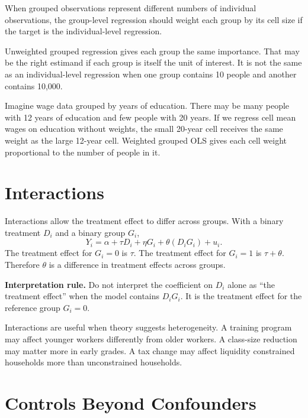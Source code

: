 \begin{thmN}
When grouped observations represent different numbers of individual
observations, the group-level regression should weight each group by its cell
size if the target is the individual-level regression.
\end{thmN}

Unweighted grouped regression gives each group the same importance. That may
be the right estimand if each group is itself the unit of interest. It is not
the same as an individual-level regression when one group contains 10 people
and another contains 10,000.

\begin{exmp}
Imagine wage data grouped by years of education. There may be many people with
12 years of education and few people with 20 years. If we regress cell mean
wages on education without weights, the small 20-year cell receives the same
weight as the large 12-year cell. Weighted grouped OLS gives each cell weight
proportional to the number of people in it.
\end{exmp}

\section{Interactions}

Interactions allow the treatment effect to differ across groups. With a binary
treatment $D_i$ and a binary group $G_i$,
\[
  Y_i=\alpha+\tau D_i+\eta G_i+\theta(D_iG_i)+u_i.
\]
The treatment effect for $G_i=0$ is $\tau$. The treatment effect for $G_i=1$
is $\tau+\theta$. Therefore $\theta$ is a difference in treatment effects
across groups.

\begin{boxD}
\textbf{Interpretation rule.} Do not interpret the coefficient on $D_i$ alone
as ``the treatment effect'' when the model contains $D_iG_i$. It is the
treatment effect for the reference group $G_i=0$.
\end{boxD}

Interactions are useful when theory suggests heterogeneity. A training program
may affect younger workers differently from older workers. A class-size
reduction may matter more in early grades. A tax change may affect liquidity
constrained households more than unconstrained households.

\section{Controls Beyond Confounders}

